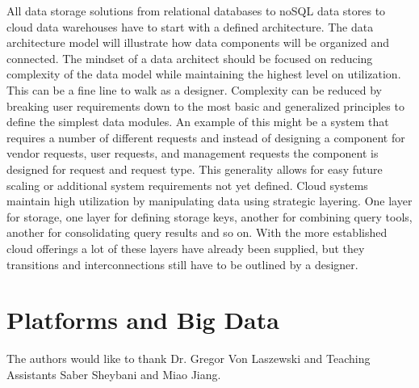 \documentclass[sigconf]{acmart}
\begin{document}
All data storage solutions from relational databases to noSQL data stores to cloud data warehouses have to start with a defined architecture. The data architecture model will illustrate how data components will be organized and connected. The mindset of a data architect should be focused on reducing complexity of the data model while maintaining the highest level on utilization. This can be a fine line to walk as a designer. Complexity can be reduced by breaking user requirements down to the most basic and generalized principles to define the simplest data modules. An example of this might be a system that requires a number of different requests and instead of designing a component for vendor requests, user requests, and management requests the component is designed for request and request type. This generality allows for easy future scaling or additional system requirements not yet defined. Cloud systems maintain high utilization by manipulating data using strategic layering. One layer for storage, one layer for defining storage keys, another for combining query tools, another for consolidating query results and so on. With the more established cloud offerings a lot of these layers have already been supplied, but they transitions and interconnections still have to be outlined by a designer\cite{Saltzer}.




\section{Platforms and Big Data}


\begin{acks}

  The authors would like to thank Dr. Gregor Von Laszewski  and Teaching Assistants Saber Sheybani and Miao Jiang.

\end{acks}


 
\end{document}
